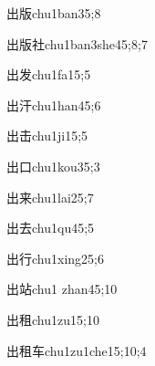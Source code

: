 \begin{verbete}{出版}{chu1ban3}{5;8}
\end{verbete}

\begin{verbete}{出版社}{chu1ban3she4}{5;8;7}
\end{verbete}

\begin{verbete}{出发}{chu1fa1}{5;5}
\end{verbete}

\begin{verbete}{出汗}{chu1han4}{5;6}
\end{verbete}

\begin{verbete}{出击}{chu1ji1}{5;5}
\end{verbete}

\begin{verbete}{出口}{chu1kou3}{5;3}
\end{verbete}

\begin{verbete}{出来}{chu1lai2}{5;7}
\end{verbete}

\begin{verbete}{出去}{chu1qu4}{5;5}
\end{verbete}

\begin{verbete}{出行}{chu1xing2}{5;6}
\end{verbete}

\begin{verbete}{出站}{chu1 zhan4}{5;10}
\end{verbete}

\begin{verbete}{出租}{chu1zu1}{5;10}
\end{verbete}

\begin{verbete}{出租车}{chu1zu1che1}{5;10;4}
\end{verbete}


